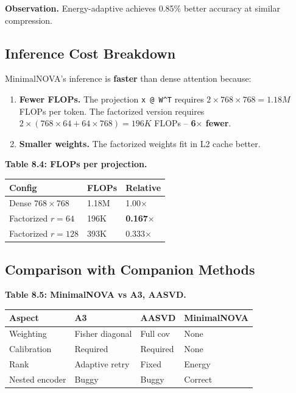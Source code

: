 \textbf{Observation.} Energy-adaptive achieves 0.85\% better 
accuracy at similar compression.

\subsection{Inference Cost Breakdown}

MinimalNOVA's inference is \textbf{faster} than dense attention because:

\begin{enumerate}
\item \textbf{Fewer FLOPs.} The projection \texttt{x @ W^T} requires $2 \times 768 \times 768 = 1.18M$
  FLOPs per token. The factorized version requires $2 \times (768 \times 64 + 64 \times 768) = 196K$
  FLOPs -- \textbf{6$\times$ fewer}.
\item \textbf{Smaller weights.} The factorized weights fit in L2 cache better.

\end{enumerate}
\textbf{Table 8.4: FLOPs per projection.}

\begin{table}[H]
\centering
\small
\begin{tabular}{lll}
\toprule
\textbf{Config} & \textbf{FLOPs} & \textbf{Relative} \\
\midrule
Dense $768 \times 768$ & 1.18M & 1.00$\times$ \\
Factorized $r=64$ & 196K & \textbf{0.167$\times$} \\
Factorized $r=128$ & 393K & 0.333$\times$ \\
\bottomrule
\end{tabular}
\end{table}

\subsection{Comparison with Companion Methods}

\textbf{Table 8.5: MinimalNOVA vs A3, AASVD.}

\begin{table}[H]
\centering
\small
\begin{tabular}{llll}
\toprule
\textbf{Aspect} & \textbf{A3} & \textbf{AASVD} & \textbf{MinimalNOVA} \\
\midrule
Weighting & Fisher diagonal & Full cov & None \\
Calibration & Required & Required & None \\
Rank & Adaptive retry & Fixed & Energy \\
Nested encoder & Buggy & Buggy & Correct \\
\bottomrule
\end{tabular}
\end{table}

